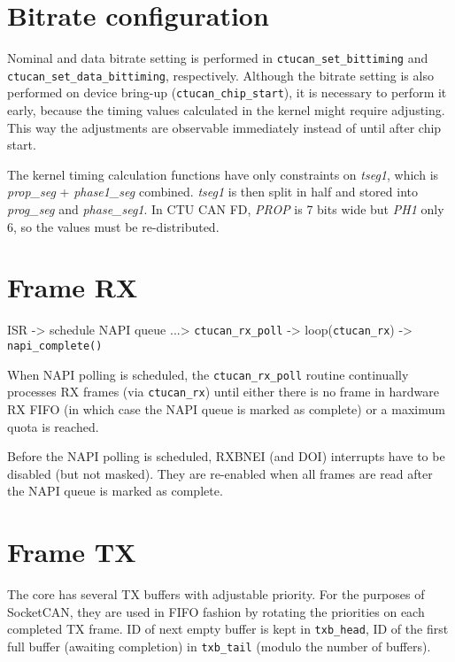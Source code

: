 \section{Bitrate configuration}

Nominal and data bitrate setting is performed in \verb|ctucan_set_bittiming|
and \verb|ctucan_set_data_bittiming|, respectively. Although the bitrate setting
is also performed on device bring-up (\verb|ctucan_chip_start|), it is necessary
to perform it early, because the timing values calculated in the kernel might
require adjusting. This way the adjustments are observable immediately instead
of until after chip start.

The kernel timing calculation functions have only constraints on \textit{tseg1},
which is \textit{prop\_seg} + \textit{phase1\_seg} combined. \textit{tseg1} is
then split in half and stored into \textit{prog\_seg} and \textit{phase\_seg1}.
In CTU CAN FD, \textit{PROP} is 7 bits wide but \textit{PH1} only 6, so the
values must be re-distributed.

\section{Frame RX}

ISR -> schedule NAPI queue ...> \verb|ctucan_rx_poll| -> loop(\verb|ctucan_rx|) -> \verb|napi_complete()|

When NAPI polling is scheduled, the \verb|ctucan_rx_poll| routine continually
processes RX frames (via \verb|ctucan_rx|) until either there is no frame
in hardware RX FIFO (in which case the NAPI queue is marked as complete) or a
maximum quota is reached.

Before the NAPI polling is scheduled, RXBNEI (and DOI) interrupts have to be
disabled (but not masked). They are re-enabled when all frames are read after
the NAPI queue is marked as complete.

\section{Frame TX}


The core has several TX buffers with adjustable priority. For the purposes of
SocketCAN, they are used in FIFO fashion by rotating the priorities on each
completed TX frame. ID of next empty buffer is kept in \verb|txb_head|,
ID of the first full buffer (awaiting completion) in \verb|txb_tail| (modulo the
number of buffers).

